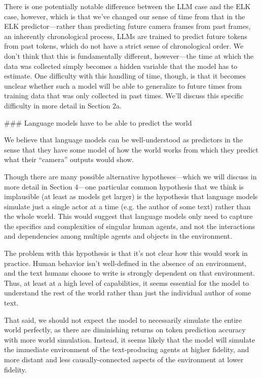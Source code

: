 {There is one potentially notable difference between the LLM case and the ELK case, however, which is that we've changed our sense of time from that in the ELK predictor---rather than predicting future camera frames from past frames, an inherently chronological process, LLMs are trained to predict future tokens from past tokens, which do not have a strict sense of chronological order. We don't think that this is fundamentally different, however---the time at which the data was collected simply becomes a hidden variable that the model has to estimate. One difficulty with this handling of time, though, is that it becomes unclear whether such a model will be able to generalize to future times from training data that was only collected in past times. We'll discuss this specific difficulty in more detail in Section 2a\cite{TODO: cite TODO}.


### Language models have to be able to predict the world

We believe that language models can be well-understood as predictors in the sense that they have some model of how the world works from which they predict what their ``camera'' outputs would show.

Though there are many possible alternative hypotheses---which we will discuss in more detail in Section 4\cite{TODO: cite TODO}---one particular common hypothesis that we think is implausible (at least as models get larger) is the hypothesis that language models simulate just a single actor at a time (e.g. the author of some text) rather than the whole world. This would suggest that language models only need to capture the specifics and complexities of singular human agents, and not the interactions and dependencies among multiple agents and objects in the environment.

The problem with this hypothesis is that it's not clear how this would work in practice. Human behavior isn't well-defined in the absence of an environment, and the text humans choose to write is strongly dependent on that environment. Thus, at least at a high level of capabilities, it seems essential for the model to understand the rest of the world rather than just the individual author of some text.

That said, we should not expect the model to necessarily simulate the entire world perfectly, as there are diminishing returns on token prediction accuracy with more world simulation. Instead, it seems likely that the model will simulate the immediate environment of the text-producing agents at higher fidelity, and more distant and less causally-connected aspects of the environment at lower fidelity.


}
